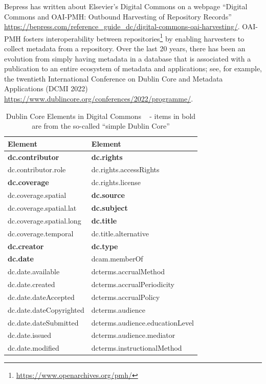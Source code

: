 \documentclass[12pt, twoside]{article}
\begin{document}
Bepress has written about Elsevier's Digital Commons on a webpage \enquote{Digital Commons and OAI-PMH: Outbound Harvesting of Repository Records} \url{https://bepress.com/reference_guide_dc/digital-commons-oai-harvesting/}. \gls{OAI-PMH} fosters interoperability between repositories\footnote{\url{https://www.openarchives.org/pmh/}} by enabling harvesters to collect metadata from a repository. Over the last 20 years, there has been an evolution from simply having metadata in a database that is associated with a publication to an entire ecosystem of metadata and applications; see, for example, the twentieth International Conference on Dublin Core and Metadata Applications (DCMI 2022) \url{https://www.dublincore.org/conferences/2022/programme/}.
\clearpage

\begin{table}[!ht]
    \caption{Dublin Core Elements in Digital Commons ~\cite{digital_commons_metadata_2016} - items in bold are from the so-called \enquote{simple Dublin Core}}
    \label{tab:dublinCoreDigitalCommons}
    \begin{scriptsize}   
    \begin{tabular}{l | l }
      \textbf{Element} & \textbf{Element} \\
      \hline
\textbf{dc.contributor} & \textbf{dc.rights}\\
dc.contributor.role & dc.rights.accessRights\\
\textbf{dc.coverage} & dc.rights.license\\
dc.coverage.spatial & \textbf{dc.source}\\
dc.coverage.spatial.lat & \textbf{dc.subject}\\
dc.coverage.spatial.long & \textbf{dc.title}\\
dc.coverage.temporal & dc.title.alternative\\
\textbf{dc.creator} & \textbf{dc.type}\\
\textbf{dc.date} & dcam.memberOf\\
dc.date.available & dcterms.accrualMethod\\
dc.date.created & dcterms.accrualPeriodicity\\
dc.date.dateAccepted & dcterms.accrualPolicy\\
dc.date.dateCopyrighted & dcterms.audience\\
dc.date.dateSubmitted & dcterms.audience.educationLevel\\
dc.date.issued & dcterms.audience.mediator\\
dc.date.modified & dcterms.instructionalMethod\\

\end{tabular}
\end{scriptsize}
\end{table}
\end{document}
